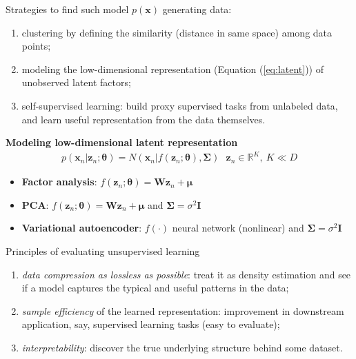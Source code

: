     Strategies to find such model $p(\boldsymbol{x})$ generating data:
    \begin{enumerate}
        \item clustering by defining the similarity (distance in same space) among data points; 
        \item modeling the low-dimensional representation (Equation (\ref{eq:latent})) 
        of unobserved latent factors;
        \item self-supervised learning: 
        build proxy supervised tasks from unlabeled data, and 
        learn useful representation from the data themselves.
    \end{enumerate}

\begin{example}
    \textbf{Modeling low-dimensional latent representation}\\
    \begin{gather}
        p(\boldsymbol{x}_n|\boldsymbol{z}_n;\boldsymbol{\theta})
        =N(\boldsymbol{x}_n|f(\boldsymbol{z}_n;\boldsymbol{\theta}),\boldsymbol{\Sigma})
        ~~~\boldsymbol{z}_n\in\mathbb{R}^K,~K\ll{D}
        \label{eq:latent}
    \end{gather}
    \begin{itemize}
        \item \textbf{Factor analysis}: 
        $f(\boldsymbol{z}_n;\boldsymbol{\theta})=\boldsymbol{W}\boldsymbol{z}_n+\boldsymbol{\mu}$
        \item \textbf{PCA}:
        $f(\boldsymbol{z}_n;\boldsymbol{\theta})=\boldsymbol{W}\boldsymbol{z}_n+\boldsymbol{\mu}$ and 
        $\boldsymbol{\Sigma}=\sigma^2\boldsymbol{I}$
        \item \textbf{Variational autoencoder}:
        $f(\cdot)$ neural network (nonlinear) and
        $\boldsymbol{\Sigma}=\sigma^2\boldsymbol{I}$
    \end{itemize}
\end{example}

Principles of evaluating unsupervised learning
\begin{enumerate}
    \item \textit{data compression as lossless as possible}:
    treat it as density estimation
    and see if a model captures the typical and useful patterns in the data;
    \item \textit{sample efficiency} of the learned representation: improvement in downstream application, 
    say, supervised learning tasks (easy to evaluate);
    \item \textit{interpretability}: discover the true underlying structure behind some dataset.
\end{enumerate}

